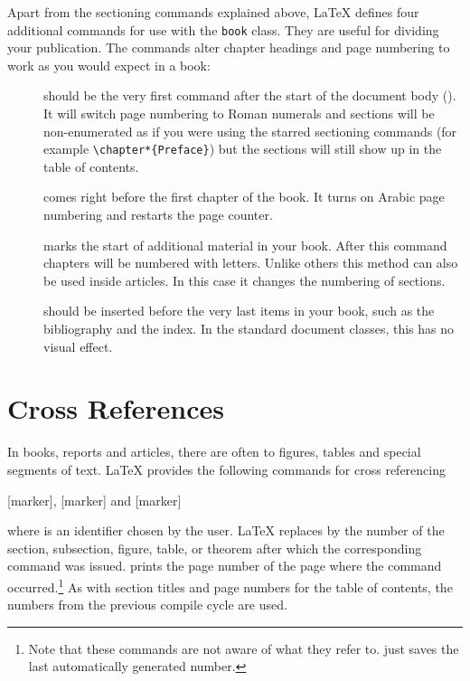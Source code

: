 Apart from the sectioning commands explained above, \LaTeX{} defines four
additional commands for use with the \texttt{book} class. They are useful for
dividing your publication. The commands alter chapter headings and page
numbering to work as you would expect in a book:
\begin{description}
  \item[] should be the very first command after
    the start of the document body (\verb||). It will switch page numbering to Roman
    numerals and sections will be non-enumerated as if you were using
    the starred sectioning commands (for example \verb|\chapter*{Preface}|)
    but the sections will still show up in the table of contents.
  \item[] comes right before the first chapter of
    the book. It turns on Arabic page numbering and restarts the page
    counter.
  \item[] marks the start of additional material in your book.
    After this command chapters will be numbered with letters. Unlike others
    this method can also be used inside articles. In this case it changes the
    numbering of sections.
  \item[] should be inserted before the very last items
    in your book, such as the bibliography and the index. In the standard
    document classes, this has no visual effect.
\end{description}

\section{Cross References}

In books, reports and articles, there are often
 to figures, tables and special segments of text.
\LaTeX{} provides the following commands for cross referencing
\begin{lscommand}
  [marker], [marker]
  and [marker]
\end{lscommand}
where  is an identifier chosen by the user. \LaTeX{} replaces
 by the number of the section, subsection, figure, table, or theorem
after which the corresponding  command was issued. 
prints the page number of the page where the  command
occurred.\footnote{Note that these commands are not aware of what they refer
  to.  just saves the last automatically generated number.} As with
section titles and page numbers for the table of contents, the numbers from the
previous compile cycle are used.

